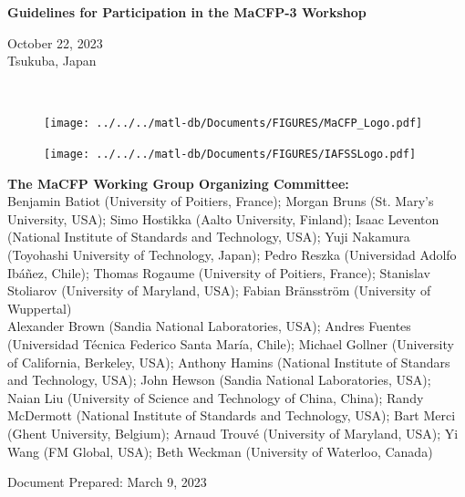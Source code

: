 \documentclass[12pt]{article}
\begin{document}

\thispagestyle{empty}



\begin{center}
\begin{Large}
{\bf Guidelines for Participation in the MaCFP-3 Workshop} \\
\end{Large}
\begin{large}
October 22, 2023\\
Tsukuba, Japan
\end{large}
\hspace{1in} \\
\end{center}


\begin{figure}[h]
  \centering
  \texttt{[image: ../../../matl-db/Documents/FIGURES/MaCFP\_Logo.pdf]}
  \label{Cover_Image}
\end{figure}

\vfill

\begin{minipage}{0.25\textwidth}
\begin{figure}[H]
\texttt{[image: ../../../matl-db/Documents/FIGURES/IAFSSLogo.pdf]}
\end{figure}
\end{minipage} \hfill
\begin{minipage}{0.65\textwidth}
\begin{flushright}
\begin{small}
{\bf The MaCFP Working Group Organizing Committee:} \\
{\footnotesize Benjamin Batiot (University of Poitiers, France); Morgan Bruns (St. Mary's University, USA); Simo Hostikka (Aalto University, Finland); Isaac Leventon (National Institute of Standards and Technology, USA); Yuji Nakamura (Toyohashi University of Technology, Japan); Pedro Reszka (Universidad Adolfo Ibáñez, Chile); Thomas Rogaume (University of Poitiers, France); Stanislav Stoliarov (University of Maryland, USA); Fabian Bränsström (University of Wuppertal)}\\
{\footnotesize Alexander Brown (Sandia National Laboratories, USA); Andres Fuentes (Universidad Técnica Federico Santa María, Chile); Michael Gollner (University of California, Berkeley, USA); Anthony Hamins (National Institute of Standars and Technology, USA); John Hewson (Sandia National Laboratories, USA); Naian Liu (University of Science and Technology of China, China); Randy McDermott (National Institute of Standards and Technology, USA); Bart Merci (Ghent University, Belgium); Arnaud Trouvé (University of Maryland, USA); Yi Wang (FM Global, USA); Beth Weckman (University of Waterloo, Canada)}


\end{small}
\end{flushright}
\end{minipage}
\begin{small}
Document Prepared: March 9, 2023\\
\end{small}
\newpage
\thispagestyle{empty}
\tableofcontents
\end{document}
